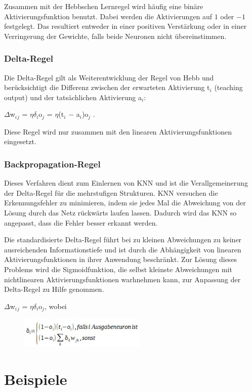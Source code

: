 Zusammen mit der Hebbschen Lernregel wird häufig eine binäre Aktivierungsfunktion benutzt. Dabei werden die Aktivierungen auf $1$ oder $-1$ festgelegt. Das resultiert entweder in einer positiven Verstärkung oder in einer Verringerung der Gewichte, falls beide Neuronen nicht übereinstimmen.
\subsubsection{Delta-Regel}

Die Delta-Regel gilt als Weiterentwicklung der Regel von Hebb und berücksichtigt die Differenz zwischen der erwarteten Aktivierung t$_i$ (teaching output) und der tatsächlichen Aktivierung a$_i$:

$\Delta$w$_i$$_j$ = $\eta$$\delta$$_i$o$_j$ = $\eta$(t$_i$ $-$ a$_i$)o$_j$ .

 Diese Regel wird nur zusammen mit den linearen Aktivierungsfunktionen eingesetzt.

\subsubsection{Backpropagation-Regel}

Dieses Verfahren dient zum Einlernen von KNN und ist die Verallgemeinerung der Delta-Regel für die mehrstufigen Strukturen.
KNN versuchen die Erkennungsfehler zu minimieren, indem sie jedes Mal die Abweichung von der Lösung durch das Netz rückwärts laufen lassen. Dadurch wird das KNN so angepasst, dass die Fehler besser erkannt werden.

Die standardisierte Delta-Regel führt bei zu kleinen Abweichungen zu keiner ausreichenden Informationstiefe und ist durch die Abhängigkeit von linearen Aktivierungsfunktionen in ihrer Anwendung beschränkt. Zur Lösung dieses Problems wird die Sigmoidfunktion, die selbst kleinste Abweichungen mit nichtlinearen Aktivierungsfunktionen warhnehmen kann, zur Anpassung der Delta-Regel zu Hilfe genommen.

$\Delta$w$_i$$_j$ = $\eta$$\delta$$_i$o$_j$,
\newline
wobei
\begin{figure}[h]
\centering
\includegraphics[width=6cm]{chapters/neural_networks/delta.jpg}

\end{figure}
\section{Beispiele}
